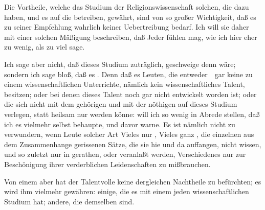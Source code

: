 Die Vortheile, welche das Studium der Religionswissenschaft solchen, die dazu  haben, und es auf die  betreiben, gewährt, sind von so großer Wichtigkeit, daß es zu seiner Empfehlung wahrlich keiner Uebertreibung bedarf. Ich will sie daher mit einer solchen Mäßigung beschreiben, daß Jeder fühlen mag, wie ich hier eher zu wenig, als zu viel sage.\par
Ich sage aber nicht, daß dieses Studium  zuträglich, geschweige denn  wäre; sondern ich sage bloß, daß es . Denn daß es Leuten, die entweder~\ gar keine  zu einem wissenschaftlichen Unterrichte, nämlich kein wissenschaftliches Talent, besitzen; oder bei denen dieses Talent noch gar nicht entwickelt worden ist; oder die sich nicht mit dem gehörigen  und mit der nöthigen  auf dieses Studium verlegen, statt heilsam nur  werden könne: will ich so wenig in Abrede stellen, daß ich es vielmehr selbst behaupte, und davor warne. Es ist nämlich nicht zu verwundern, wenn Leute solcher Art Vieles nur , Vieles ganz , die einzelnen aus dem Zusammenhange gerissenen Sätze, die sie hie und da auffangen, nicht  wissen, und so zuletzt nur in  gerathen, oder veranlaßt werden, Verschiedenes nur zur Beschönigung ihrer verderblichen Leidenschaften zu mißbrauchen.\par
Von einem  aber hat der Talentvolle keine dergleichen Nachtheile zu befürchten; es wird ihm vielmehr  gewähren: einige, die es mit einem jeden  wissenschaftlichen Studium  hat; andere, die demselben  sind.
